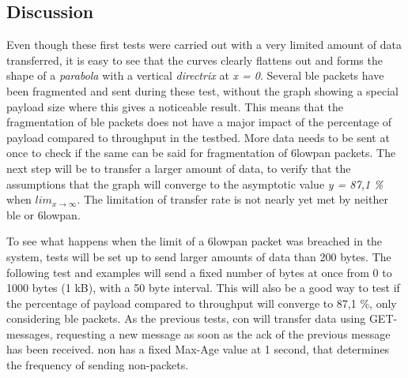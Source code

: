 \subsection{Discussion}

\noindent Even though these first tests were carried out with a very limited amount of data transferred, it is easy to see that the curves clearly flattens out and forms the shape of a \textit{parabola} with a vertical \textit{directrix} at \textit{x = 0}. Several \gls{ble} packets have been fragmented and sent during these test, without the graph showing a special \gls{payload} size where this gives a noticeable result. This means that the fragmentation of \gls{ble} packets does not have a major impact of the percentage of payload compared to throughput in the testbed. More data needs to be sent at once to check if the same can be said for fragmentation of \gls{6lowpan} packets. The next step will be to transfer a larger amount of data, to verify that the assumptions that the graph will converge to the asymptotic value \textit{y = 87,1 \%} when $lim_{x\to\infty}$. The limitation of transfer rate is not nearly yet met by neither \gls{ble} or \gls{6lowpan}. 



\noindent To see what happens when the limit of a \gls{6lowpan} packet was breached in the system, tests will be set up to send larger amounts of data than 200 bytes. The following test and examples will send a fixed number of bytes at once from 0 to 1000 bytes (1 kB), with a 50 byte interval. This will also be a good way to test if the percentage of \gls{payload} compared to \gls{throughput} will converge to 87,1 \%, only considering \gls{ble} packets. As the previous tests, \gls{con} will transfer data using GET-messages, requesting a new message as soon as the \gls{ack} of the previous message has been received. \gls{non} has a fixed Max-Age value at 1 second, that determines the frequency of sending \gls{non}-packets. 


